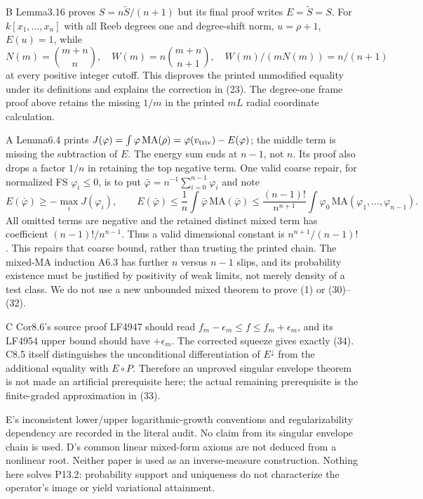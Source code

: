 \documentclass[
  11pt,
]{article}
\begin{document}
B Lemma3.16 proves \(S=n\widetilde S/(n+1)\) but its final proof writes
\(E=\widetilde S=S\). For \(k[x_1,\ldots,x_n]\) with all Reeb degrees
one and degree-shift norm, \(u=\rho+1\), \(E(u)=1\), while
\[ N(m)=\binom{m+n}{n},\quad W(m)=n\binom{m+n}{n+1},\quad
 W(m)/(mN(m))=n/(n+1)\] at every positive integer cutoff. This disproves
the printed unmodified equality under its definitions and explains the
correction in (23). The degree-one frame proof above retains the missing
\(1/m\) in the printed \(mL\) radial coordinate calculation.

A Lemma6.4 prints
\(J(\varphi)=\int\varphi\,\mathrm{MA}(\rho)=\varphi(v_{\rm triv})-E(\varphi)\);
the middle term is missing the subtraction of \(E\). The energy sum ends
at \(n-1\), not \(n\). Its proof also drops a factor \(1/n\) in
retaining the top negative term. One valid coarse repair, for normalized
FS \(\varphi_i\leq0\), is to put
\(\bar\varphi=n^{-1}\sum_{i=0}^{n-1}\varphi_i\) and note
\[ E(\bar\varphi)\geq-\max_iJ(\varphi_i),\qquad
 E(\bar\varphi)\leq\frac1n\int\bar\varphi\,\mathrm{MA}(\bar\varphi)
 \leq\frac{(n-1)!}{n^{n+1}}\int\varphi_0\,\mathrm{MA}(\varphi_1,\ldots,\varphi_{n-1}).\]
All omitted terms are negative and the retained distinct mixed term has
coefficient \((n-1)!/n^{n-1}\). Thus a valid dimensional constant is
\(n^{n+1}/(n-1)!\). This repairs that coarse bound, rather than trusting
the printed chain. The mixed-MA induction A6.3 has further \(n\) versus
\(n-1\) slips, and its probability existence must be justified by
positivity of weak limits, not merely density of a test class. We do not
use a new unbounded mixed theorem to prove (1) or (30)--(32).

C Cor8.6's source proof LF4947 should read
\(f_m-\epsilon_m\leq f\leq f_m+\epsilon_m\), and its LF4954 upper bound
should have \(+\epsilon_m\). The corrected squeeze gives exactly (34).
C8.5 itself distinguishes the unconditional differentiation of
\(E^\downarrow\) from the additional equality with \(E\circ P\).
Therefore an unproved singular envelope theorem is not made an
artificial prerequisite here; the actual remaining prerequisite is the
finite-graded approximation in (33).

E's inconsistent lower/upper logarithmic-growth conventions and
regularizability dependency are recorded in the literal audit. No claim
from its singular envelope chain is used. D's common linear mixed-form
axioms are not deduced from a nonlinear root. Neither paper is used as
an inverse-measure construction. Nothing here solves P13.2: probability
support and uniqueness do not characterize the operator's image or yield
variational attainment.
\end{document}
